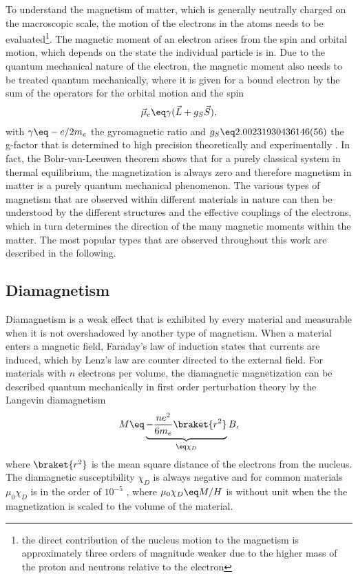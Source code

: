 \documentclass[\main/dresen_thesis.tex]{subfiles}
\begin{document}
    To understand the magnetism of matter, which is generally neutrally charged on the macroscopic scale, the motion of the electrons in the atoms needs to be evaluated\footnote{the direct contribution of the nucleus motion to the magnetism is approximately three orders of magnitude weaker due to the higher mass of the proton and neutrons relative to the electron}.
    The magnetic moment of an electron arises from the spin and orbital motion, which depends on the state the individual particle is in.
    Due to the quantum mechanical nature of the electron, the magnetic moment also needs to be treated quantum mechanically, where it is given for a bound electron by the sum of the operators for the orbital motion and the spin \cite{Coey_2010_Magne}
    \begin{align}
      \vec{\mu}_e \eq \gamma (\vec{L} + g_S \vec{S}),
    \end{align}
    with $\gamma \eq -e/2m_e$ the gyromagnetic ratio and $g_S \eq 2.00231930436146(56)$ the g-factor that is determined to high precision theoretically and experimentally \cite{Aoyama_2012_Tenth, Hanneke_2011_Cavit}.
    In fact, the Bohr-van-Leeuwen theorem shows that for a purely classical system in thermal equilibrium, the magnetization is always zero and therefore magnetism in matter is a purely quantum mechanical phenomenon.
    The various types of magnetism that are observed within different materials in nature can then be understood by the different structures and the effective couplings of the electrons, which in turn determines the direction of the many magnetic moments within the matter.
    The most popular types that are observed throughout this work are described in the following.

    \subsection{Diamagnetism}
      Diamagnetism is a weak effect that is exhibited by every material and measurable when it is not overshadowed by another type of magnetism.
      When a material enters a magnetic field, Faraday's law of induction states that currents are induced, which by Lenz's law are counter directed to the external field.
      For materials with $n$ electrons per volume, the diamagnetic magnetization can be described quantum mechanically in first order perturbation theory by the Langevin diamagnetism \cite{Blundell_2001_Magne}
      \begin{align}
        M \eq \underbrace{- \frac{n e^2}{6 m_e} \braket{r^2}}_{\eq \chi_D} B,
      \end{align}
      where $\braket{r^2}$ is the mean square distance of the electrons from the nucleus.
      The diamagnetic susceptibility $\chi_D$ is always negative and for common materials $\mu_0 \chi_D$ is in the order of $10^{-5}$ \cite{Lide_2004_Handb}, where $\mu_0 \chi_D \eq M/H$ is without unit when the the magnetization is scaled to the volume of the material.
\end{document}
